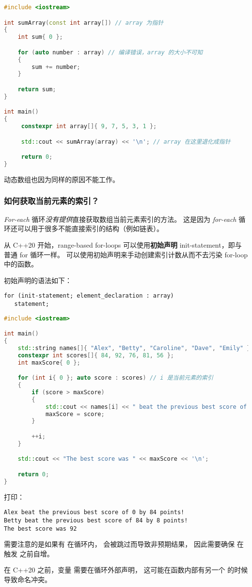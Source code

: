 \documentclass[../../LearnCpp.tex]{subfiles}
\begin{document}
\begin{lstlisting}[language=C++]
#include <iostream>

int sumArray(const int array[]) // array 为指针
{
    int sum{ 0 };

    for (auto number : array) // 编译错误，array 的大小不可知
    {
        sum += number;
    }

    return sum;
}

int main()
{
     constexpr int array[]{ 9, 7, 5, 3, 1 };

     std::cout << sumArray(array) << '\n'; // array 在这里退化成指针

     return 0;
}
\end{lstlisting}

动态数组也因为同样的原因不能工作。

\subsubsection*{如何获取当前元素的索引？}

\textit{For-each} 循环\textit{没有提供}直接获取数组当前元素索引的方法。
这是因为 \textit{for-each} 循环还可以用于很多不能直接索引的结构（例如链表）。

从 C++20 开始，range-based for-loops 可以使用\textbf{初始声明} init-statement，即与普通 for 循环一样。
可以使用初始声明来手动创建索引计数从而不去污染 for-loop 中的函数。

初始声明的语法如下：

\begin{lstlisting}
for (init-statement; element_declaration : array)
   statement;
\end{lstlisting}

\begin{lstlisting}[language=C++]
#include <iostream>

int main()
{
    std::string names[]{ "Alex", "Betty", "Caroline", "Dave", "Emily" }; // 学生名字
    constexpr int scores[]{ 84, 92, 76, 81, 56 };
    int maxScore{ 0 };

    for (int i{ 0 }; auto score : scores) // i 是当前元素的索引
    {
        if (score > maxScore)
        {
            std::cout << names[i] << " beat the previous best score of " << maxScore << " by " << (score - maxScore) << " points!\n";
            maxScore = score;
        }

        ++i;
    }

    std::cout << "The best score was " << maxScore << '\n';

    return 0;
}
\end{lstlisting}

打印：

\begin{lstlisting}
Alex beat the previous best score of 0 by 84 points!
Betty beat the previous best score of 84 by 8 points!
The best score was 92
\end{lstlisting}

需要注意的是如果有  在循环内， 会被跳过而导致非预期结果，
因此需要确保  在触发  之前自增。

在 C++20 之前，变量  需要在循环外部声明，
这可能在函数内部有另一个  的时候导致命名冲突。
\end{document}
